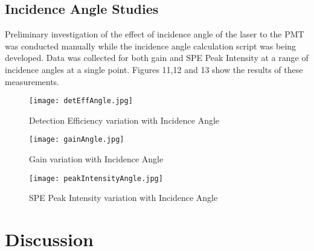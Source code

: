 \documentclass[journal]{IEEEtran}
\begin{document}
\subsection{Incidence Angle Studies}

Preliminary investigation of the effect of incidence angle of the laser to the PMT was conducted manually while the incidence angle calculation script was being developed.  Data was collected for both gain and SPE Peak Intensity at a range of incidence angles at a single point. Figures 11,12 and 13 show the results of these measurements.

\FloatBarrier
\begin{figure}[!htpb]
	\centering	
	\texttt{[image: detEffAngle.jpg]}
	\caption{Detection Efficiency variation with Incidence Angle}
\end{figure}
\FloatBarrier
\begin{figure}[!htpb]
	\centering	
	\texttt{[image: gainAngle.jpg]}
	\caption{Gain variation with Incidence Angle}
\end{figure}
\FloatBarrier
\begin{figure}[!htpb]
	\centering	
	\texttt{[image: peakIntensityAngle.jpg]}
	\caption{SPE Peak Intensity variation with Incidence Angle}
\end{figure}
\FloatBarrier

%
%
%
%
\section{Discussion}
\end{document}
